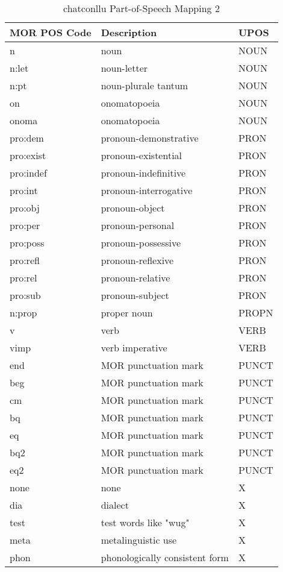 \newpage
\vspace{-2cm}
\begin{table}[h!]
\caption {chatconllu Part-of-Speech Mapping 2} \label{tab:posmap2}
\begin{tabular}{@{}lll@{}}
\toprule
\textbf{MOR POS Code} & \textbf{Description} & \textbf{UPOS}\\ \midrule
n & noun & NOUN\\
n:let & noun-letter & NOUN\\
n:pt & noun-plurale tantum & NOUN\\
on & onomatopoeia & NOUN\\
onoma & onomatopoeia & NOUN\\\midrule
pro:dem & pronoun-demonstrative & PRON\\
pro:exist & pronoun-existential & PRON\\
pro:indef & pronoun-indefinitive & PRON\\
pro:int & pronoun-interrogative & PRON\\
pro:obj & pronoun-object & PRON\\
pro:per & pronoun-personal & PRON\\
pro:poss & pronoun-possessive & PRON\\
pro:refl & pronoun-reflexive & PRON\\
pro:rel & pronoun-relative & PRON\\
pro:sub & pronoun-subject & PRON\\\midrule
n:prop & proper noun & PROPN\\\midrule
v & verb & VERB\\
vimp & verb imperative & VERB\\\midrule
end & MOR punctuation mark & PUNCT\\
beg & MOR punctuation mark & PUNCT\\
cm & MOR punctuation mark & PUNCT\\
bq & MOR punctuation mark & PUNCT\\
eq & MOR punctuation mark & PUNCT\\
bq2 & MOR punctuation mark & PUNCT\\
eq2 & MOR punctuation mark & PUNCT\\\midrule
none & none & X\\
dia & dialect & X\\
test & test words like "wug" & X\\
meta & metalinguistic use & X\\
phon & phonologically consistent form & X\\

\end{tabular}
\end{table}

